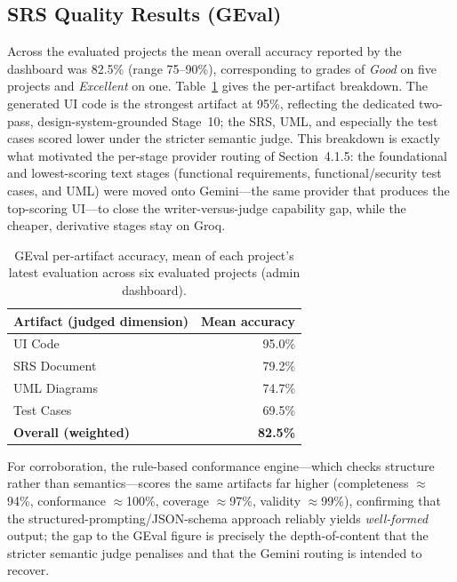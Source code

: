 \documentclass[12pt,a4paper,oneside]{report}
\begin{document}
\subsection{SRS Quality Results (GEval)}
Across the evaluated projects the mean overall accuracy reported by the dashboard was 82.5\% (range 75--90\%), corresponding to grades of \emph{Good} on five projects and \emph{Excellent} on one. Table~\ref{tab:accuracy} gives the per-artifact breakdown. The generated UI code is the strongest artifact at 95\%, reflecting the dedicated two-pass, design-system-grounded Stage~10; the SRS, UML, and especially the test cases scored lower under the stricter semantic judge. This breakdown is exactly what motivated the per-stage provider routing of Section~4.1.5: the foundational and lowest-scoring text stages (functional requirements, functional/security test cases, and UML) were moved onto Gemini---the same provider that produces the top-scoring UI---to close the writer-versus-judge capability gap, while the cheaper, derivative stages stay on Groq.

\begin{table}[ht]
\centering
\caption{GEval per-artifact accuracy, mean of each project's latest evaluation across six evaluated projects (admin dashboard).}
\label{tab:accuracy}
\begin{tabular}{l r}
\toprule
\textbf{Artifact (judged dimension)} & \textbf{Mean accuracy} \\
\midrule
UI Code      & 95.0\% \\
SRS Document & 79.2\% \\
UML Diagrams & 74.7\% \\
Test Cases   & 69.5\% \\
\midrule
\textbf{Overall (weighted)} & \textbf{82.5\%} \\
\bottomrule
\end{tabular}
\end{table}

For corroboration, the rule-based conformance engine---which checks structure rather than semantics---scores the same artifacts far higher (completeness $\approx$94\%, conformance $\approx$100\%, coverage $\approx$97\%, validity $\approx$99\%), confirming that the structured-prompting/JSON-schema approach reliably yields \emph{well-formed} output; the gap to the GEval figure is precisely the depth-of-content that the stricter semantic judge penalises and that the Gemini routing is intended to recover.
\end{document}
